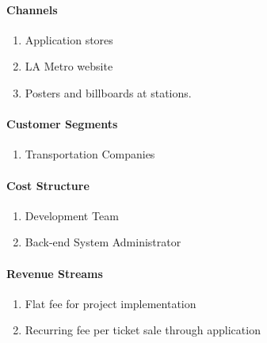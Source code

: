  		\paragraph{Channels}\begin{enumerate}
 			\item Application stores
 			\item LA Metro website
 			\item Posters and billboards at stations. 
 		\end{enumerate}
 		
 		\paragraph{Customer Segments}\begin{enumerate}
 			\item Transportation Companies
 		\end{enumerate}
 		
 		\paragraph{Cost Structure}\begin{enumerate}
 			\item Development Team
 			\item Back-end System Administrator
 		\end{enumerate}
 		
 		\paragraph{Revenue Streams}\begin{enumerate}
 			\item Flat fee for project implementation
 			\item Recurring fee per ticket sale through application
 		\end{enumerate}